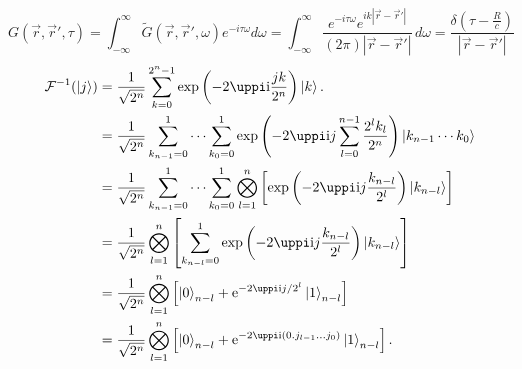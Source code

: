 \documentclass[11pt]{article}
\def\ee{\mathrm{e}}
\def\ii{\mathrm{i}}
\begin{document}
\[G(\vec{r},{\vec{r}}',\tau )=\int _{-\infty }^{\infty }\tilde{G}(\vec{r},{\vec{r}}',\omega )e^{-i \tau  \omega }d\omega=\int_{-\infty }^{\infty } \frac{e^{-i \tau  \omega } e^{i k |\vec{r}-{\vec{r}}'| }}{(2 \pi ) |\vec{r}-{\vec{r}}'| } \, d\omega=\frac{\delta  \left(\tau -\frac{R}{c}\right)}{|\vec{r}-{\vec{r}}'| }\]
\[
\begin{split}	
\mathcal{F}^{-1}(\ket{j})
&{}=\frac{1}{\sqrt{2^n}}\sum_{k=0}^{2^n-1}\exp\left(-2\uppi \ii \frac{jk}{2^n}\right)\ket{k}.\\
&{}=\frac{1}{\sqrt{2^n}}\sum_{k_{n-1}=0}^1\cdots\sum_{k_{0}=0}^1\exp\left(-2\uppi \ii j\sum_{l=0}^{n-1}\frac{2^l k_l}{2^n}\right)\ket{k_{n-1}\cdots k_0}\\
&{}=\frac{1}{\sqrt{2^n}}\sum_{k_{n-1}=0}^1\cdots\sum_{k_{0}=0}^1\bigotimes_{l=1}^n\left[\exp\left(-2\uppi \ii j\frac{k_{n-l}}{2^l}\right)\ket{k_{n-l}}\right]\\
&{}=\frac{1}{\sqrt{2^n}}\bigotimes_{l=1}^n\left[\sum_{k_{n-l}=0}^1\exp\left(-2\uppi \ii j\frac{k_{n-l}}{2^l}\right)\ket{k_{n-l}}\right]\\
&{}=\frac{1}{\sqrt{2^n}}\bigotimes_{l=1}^n\left[\ket{0}_{n-l}+\ee^{-2\uppi \ii j /2^l}\ket{1}_{n-l}\right]\\
&{}=\frac{1}{\sqrt{2^n}}\bigotimes_{l=1}^n\left[\ket{0}_{n-l}+\ee^{-2\uppi \ii ({0.j_{l-1}\ldots j_0})}\ket{1}_{n-l}\right].
\end{split}
\]
\end{document}
